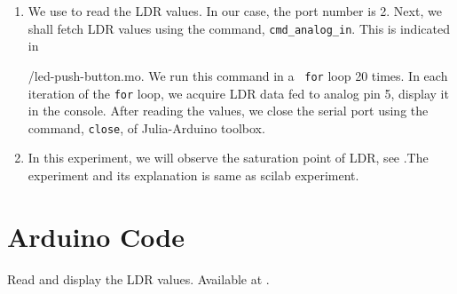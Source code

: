 \begin{enumerate}
\item We use  to read the LDR values. In
  our case, the port number is 2. Next, we shall fetch LDR values
  using the command, {\tt cmd\_analog\_in}. This is indicated in 
  
  {\LocPushOpenModelicacode/led-push-button.mo}. We run this command in a {\tt
    for} loop 20 times. In each iteration of the {\tt for} loop, we
  acquire LDR data fed to analog pin 5, display it in the console. 
  After reading the values, we close the serial port using the
  command, {\tt close}, of Julia-Arduino toolbox.

\item In this experiment, we will observe the saturation point of LDR,
  see .The experiment and its explanation is same 
  as scilab experiment.
\end{enumerate}




\section{Arduino Code}
\label{sec:ldr-arduino-code}

\begin{ardcode}
{Read and display the LDR values.  Available at
  .}
\label{ard:ldr-read}

\end{ardcode}

